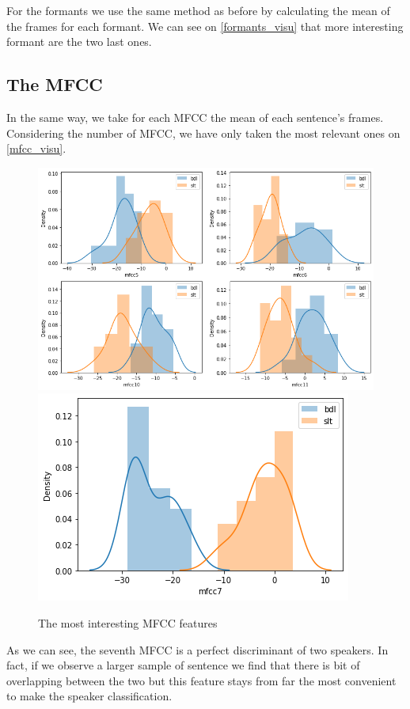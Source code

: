 \documentclass[]{article}
\begin{document}
For the formants we use the same method as before by calculating the mean of the frames for
each formant. We can see on \autoref{formants_visu} that more interesting formant are the two
last ones.

\subsection{The MFCC}

In the same way, we take for each MFCC the mean of each sentence's frames. Considering
the number of MFCC, we have only taken the most relevant ones on \autoref{mfcc_visu}. 

\begin{figure}[H]
    \centering
    \caption{\label{mfcc_visu}The most interesting MFCC features}
    \includegraphics[scale=0.5]{images/mfcc_visu.png}
    \includegraphics[scale=0.5]{images/mfcc7_visu.png}
\end{figure}

As we can see, the seventh MFCC is a perfect discriminant of two speakers. In fact,
if we observe a larger sample of sentence we find that there is bit of overlapping 
between the two but this feature stays from far the most convenient to make the
speaker classification.
\end{document}
